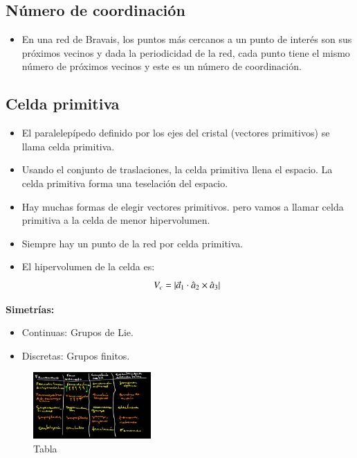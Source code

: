 \subsection{Número de coordinación}

\begin{itemize}
    \item En una red de Bravais, los puntos más cercanos a un punto de interés son sus próximos vecinos y dada la periodicidad de la red, cada punto tiene el mismo número de próximos vecinos y este es un número de coordinación.
\end{itemize}

\subsection{Celda primitiva}

\begin{itemize}
    \item El paralelepípedo definido por los ejes del cristal (vectores primitivos) se llama celda primitiva.
    \item Usando el conjunto de traslaciones, la celda primitiva llena el espacio. La celda primitiva forma una teselación del espacio.
    \item Hay muchas formas de elegir vectores primitivos. pero vamos a llamar celda primitiva a la celda de menor hipervolumen.
    \item Siempre hay un punto de la red por celda primitiva.
    \item El hipervolumen de la celda es:
    $$V_c=\abs*{\vec{a}_1\cdot\hat{a}_2\times\hat{a}_3}$$
\end{itemize}

\textbf{Simetrías:}

\begin{itemize}
    \item[\texttimes] Continuas: Grupos de Lie.
    \item[\checkmark] Discretas: Grupos finitos.
\end{itemize}

\begin{figure}[H]
    \centering
    \includegraphics[width=0.4\textwidth]{Graficas/Aug20.png}
    \caption{Tabla }
    \label{fig:TablaAug20}
\end{figure}


